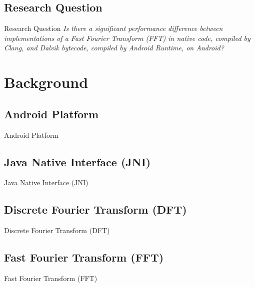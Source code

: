 \documentclass{beamer}
\begin{document}
\subsection{Research Question}
\begin{frame}{Research Question}
\centering
\emph{Is there a significant performance difference between implementations of a Fast Fourier Transform (FFT) in native code, compiled by Clang, and Dalvik bytecode, compiled by Android Runtime, on Android?}
\end{frame}

\section{Background}

\subsection{Android Platform}
\begin{frame}{Android Platform}
\end{frame}

\subsection{Java Native Interface (JNI)}
\begin{frame}{Java Native Interface (JNI)}
\end{frame}

\subsection{Discrete Fourier Transform (DFT)}
\begin{frame}{Discrete Fourier Transform (DFT)}
\end{frame}

\subsection{Fast Fourier Transform (FFT)}
\begin{frame}{Fast Fourier Transform (FFT)}
\end{frame}
\end{document}
